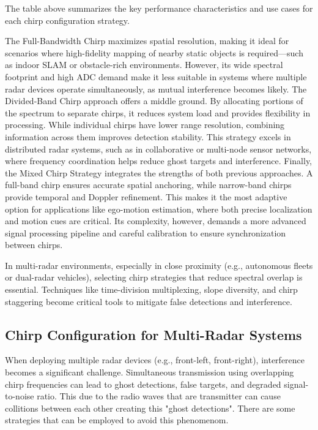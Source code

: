 \vspace{1em}

The table above summarizes the key performance characteristics and use cases for each chirp configuration strategy.

The Full-Bandwidth Chirp maximizes spatial resolution, making it ideal for scenarios where high-fidelity mapping of nearby static objects is required—such as indoor SLAM or obstacle-rich environments. 
However, its wide spectral footprint and high ADC demand make it less suitable in systems where multiple radar devices operate simultaneously, as mutual interference becomes likely.
The Divided-Band Chirp approach offers a middle ground.
By allocating portions of the spectrum to separate chirps, it reduces system load and provides flexibility in processing. 
While individual chirps have lower range resolution, combining information across them improves detection stability. This strategy excels in distributed radar systems, such as in collaborative or multi-node sensor networks, where frequency coordination helps reduce ghost targets and interference.
Finally, the Mixed Chirp Strategy integrates the strengths of both previous approaches. 
A full-band chirp ensures accurate spatial anchoring, while narrow-band chirps provide temporal and Doppler refinement. 
This makes it the most adaptive option for applications like ego-motion estimation, where both precise localization and motion cues are critical. 
Its complexity, however, demands a more advanced signal processing pipeline and careful calibration to ensure synchronization between chirps.

In multi-radar environments, especially in close proximity (e.g., autonomous fleets or dual-radar vehicles), selecting chirp strategies that reduce spectral overlap is essential. Techniques like time-division multiplexing, slope diversity, and chirp staggering become critical tools to mitigate false detections and interference.

\vspace{1em}

\subsection{Chirp Configuration for Multi-Radar Systems}
\label{sec:chirp-multiradar}

When deploying multiple radar devices (e.g., front-left, front-right), interference becomes a significant challenge.
Simultaneous transmission using overlapping chirp frequencies can lead to ghost detections, false targets, and degraded signal-to-noise ratio. 
This due to the radio waves that are transmitter can cause collitions between each other creating this "ghost detections".
There are some strategies that can be employed to avoid this phenomenom.


